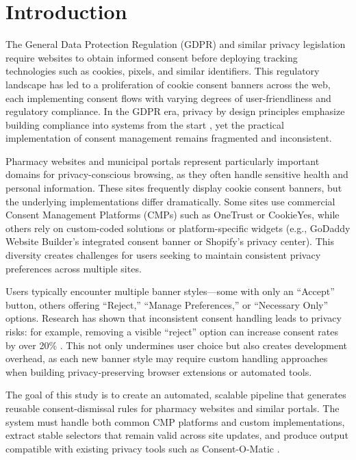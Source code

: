 \documentclass[conference]{IEEEtran}
\begin{document}
\section{Introduction}

The General Data Protection Regulation (GDPR) and similar privacy legislation require websites to obtain informed consent before deploying tracking technologies such as cookies, pixels, and similar identifiers. This regulatory landscape has led to a proliferation of cookie consent banners across the web, each implementing consent flows with varying degrees of user-friendliness and regulatory compliance. In the GDPR era, privacy by design principles emphasize building compliance into systems from the start \cite{hildebrandt2018}, yet the practical implementation of consent management remains fragmented and inconsistent.

Pharmacy websites and municipal portals represent particularly important domains for privacy-conscious browsing, as they often handle sensitive health and personal information. These sites frequently display cookie consent banners, but the underlying implementations differ dramatically. Some sites use commercial Consent Management Platforms (CMPs) such as OneTrust or CookieYes, while others rely on custom-coded solutions or platform-specific widgets (e.g., GoDaddy Website Builder's integrated consent banner or Shopify's privacy center). This diversity creates challenges for users seeking to maintain consistent privacy preferences across multiple sites.

Users typically encounter multiple banner styles—some with only an ``Accept'' button, others offering ``Reject,'' ``Manage Preferences,'' or ``Necessary Only'' options. Research has shown that inconsistent consent handling leads to privacy risks: for example, removing a visible ``reject'' option can increase consent rates by over 20\% \cite{nouwens2020}. This not only undermines user choice but also creates development overhead, as each new banner style may require custom handling approaches when building privacy-preserving browser extensions or automated tools.

The goal of this study is to create an automated, scalable pipeline that generates reusable consent-dismissal rules for pharmacy websites and similar portals. The system must handle both common CMP platforms and custom implementations, extract stable selectors that remain valid across site updates, and produce output compatible with existing privacy tools such as Consent-O-Matic \cite{consentomatic}.
\end{document}
